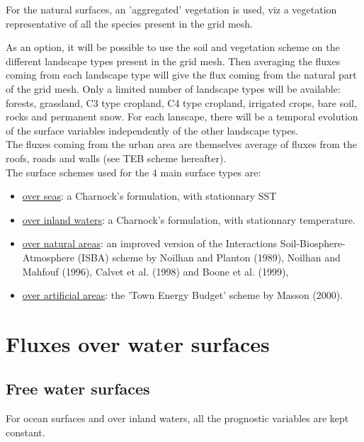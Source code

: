 \bigskip

For the natural surfaces,
an 'aggregated' vegetation is used, viz
a vegetation representative of all the species present
in the grid mesh.

As an option, it will be possible to use the soil and
vegetation scheme on the different landscape types present in the grid mesh.
Then averaging the fluxes coming from each landscape type will give
the flux coming from the natural part of the grid mesh.
Only a limited number of landscape types will be available:
forests, grassland, C3 type cropland, C4 type cropland, irrigated crops,
bare soil, rocks and permanent snow. For each lanscape,
there will be a temporal
evolution of the surface variables independently of the other landscape types.\\

The fluxes coming from the urban area are themselves average
of fluxes from the roofs, roads and walls (see TEB scheme hereafter).\\




The surface schemes used for the 4 main surface types are:

\begin{itemize}
\item \underline{over seas}: a  Charnock's formulation, with stationnary SST
\item \underline{over inland waters}: a Charnock's formulation, with stationnary
temperature.
\item \underline{over natural areas}:
an improved version of the
Interactions Soil-Biosphere-Atmosphere (ISBA) scheme
by Noilhan and Planton (1989), Noilhan and Mahfouf (1996),
Calvet et al. (1998) and Boone et al. (1999),
\item \underline{over artificial areas}:
the 'Town Energy Budget' scheme by Masson (2000).
\end{itemize}

\clearpage
\section{Fluxes over water surfaces}

\subsection{Free water surfaces}

For ocean surfaces and over inland waters,
all the prognostic variables are kept constant.

